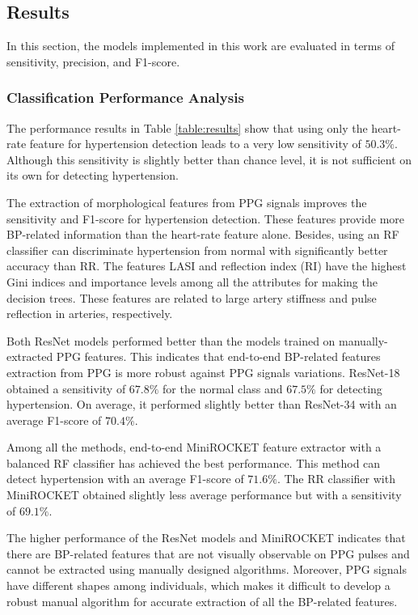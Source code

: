 \documentclass[letterpaper, 10 pt, conference]{ieeeconf}
\begin{document}
\subsection{Results}
In this section, the models implemented in this work are evaluated in terms of sensitivity, precision, and F1-score.

\subsubsection{Classification Performance Analysis}
The performance results in Table \ref{table:results} show that using only the heart-rate feature for hypertension detection leads to a very low sensitivity of $50.3\%$. Although this sensitivity is slightly better than chance level, it is not sufficient on its own for detecting hypertension.

The extraction of morphological features from PPG signals improves the sensitivity and F1-score for hypertension detection. These features provide more BP-related information than the heart-rate feature alone. Besides, using an RF classifier can discriminate hypertension from normal with significantly better accuracy than RR. The features LASI and reflection index (RI) have the highest Gini indices and importance levels among all the attributes for making the decision trees. These features are related to large artery stiffness and pulse reflection in arteries, respectively.


Both ResNet models performed better than the models trained on manually-extracted PPG features. This indicates that end-to-end BP-related features extraction from PPG is more robust against PPG signals variations. ResNet-18 obtained a sensitivity of $67.8\%$ for the normal class and $67.5\%$ for detecting hypertension. On average, it performed slightly better than ResNet-34 with an average F1-score of $70.4\%$. 

Among all the methods, end-to-end MiniROCKET feature extractor with a balanced RF classifier has achieved the best performance. This method can detect hypertension with an average F1-score of $71.6\%$. The RR classifier with MiniROCKET obtained slightly less average performance but with a sensitivity of $69.1\%$.

The higher performance of the ResNet models and MiniROCKET indicates that there are BP-related features that are not visually observable on PPG pulses and cannot be extracted using manually designed algorithms. Moreover, PPG signals have different shapes among individuals, which makes it difficult to develop a robust manual algorithm for accurate extraction of all the BP-related features.
\end{document}
